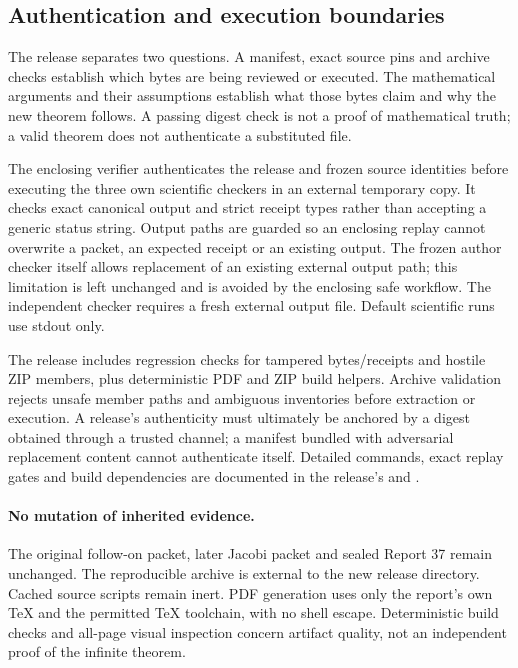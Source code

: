 \documentclass[11pt,letterpaper]{article}
\theoremstyle{definition}\newtheorem{definition}[theorem]{Definition}
\theoremstyle{remark}\newtheorem{remark}[theorem]{Remark}
\newcommand{\code}[1]{\texttt{\detokenize{#1}}}
\begin{document}
\subsection{Authentication and execution boundaries}
The release separates two questions. A manifest, exact source pins and archive checks establish which bytes are being reviewed or executed. The mathematical arguments and their assumptions establish what those bytes claim and why the new theorem follows. A passing digest check is not a proof of mathematical truth; a valid theorem does not authenticate a substituted file.

The enclosing verifier authenticates the release and frozen source identities before executing the three own scientific checkers in an external temporary copy. It checks exact canonical output and strict receipt types rather than accepting a generic status string. Output paths are guarded so an enclosing replay cannot overwrite a packet, an expected receipt or an existing output. The frozen author checker itself allows replacement of an existing external output path; this limitation is left unchanged and is avoided by the enclosing safe workflow. The independent checker requires a fresh external output file. Default scientific runs use stdout only.

The release includes regression checks for tampered bytes/receipts and hostile ZIP members, plus deterministic PDF and ZIP build helpers. Archive validation rejects unsafe member paths and ambiguous inventories before extraction or execution. A release's authenticity must ultimately be anchored by a digest obtained through a trusted channel; a manifest bundled with adversarial replacement content cannot authenticate itself. Detailed commands, exact replay gates and build dependencies are documented in the release's \code{README.md} and \code{INTEGRITY.md}.

\paragraph{No mutation of inherited evidence.}
The original follow-on packet, later Jacobi packet and sealed Report 37 remain unchanged. The reproducible archive is external to the new release directory. Cached source scripts remain inert. PDF generation uses only the report's own TeX and the permitted TeX toolchain, with no shell escape. Deterministic build checks and all-page visual inspection concern artifact quality, not an independent proof of the infinite theorem.
\end{document}
